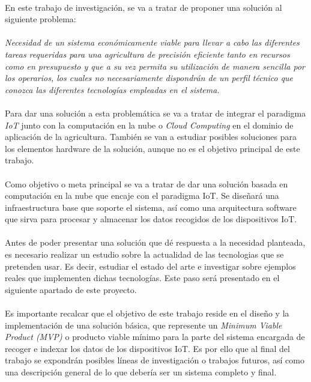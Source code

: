 \documentclass[../../memoria.tex]{subfiles}
\begin{document}
\paragraph{}
En este trabajo de investigación, se va a tratar de proponer una solución al siguiente problema:

\paragraph{}
\textit{
    Necesidad de un sistema económicamente viable para llevar a cabo las diferentes tareas requeridas para una agricultura de precisión eficiente tanto en recursos como en presupuesto y que a su vez permita su utilización de manera sencilla por los operarios, los cuales no necesariamente dispondrán de un perfil técnico que conozca las diferentes tecnologías empleadas en el sistema.
}

\paragraph{}
Para dar una solución a esta problemática se va a tratar de integrar el paradigma \textit{IoT} junto con la computación en la nube o \textit{Cloud Computing} en el dominio de aplicación de la agricultura. También se van a estudiar posibles soluciones para los elementos hardware de la solución, aunque no es el objetivo principal de este trabajo.

\paragraph{}
Como objetivo o meta principal se va a tratar de dar una solución basada en computación en la nube que encaje con el paradigma IoT. Se diseñará una infraestructura base que soporte el sistema, así como una arquitectura software que sirva para procesar y almacenar los datos recogidos de los dispositivos IoT.

\paragraph{}
Antes de poder presentar una solución que dé respuesta a la necesidad planteada, es necesario realizar un estudio sobre la actualidad de las tecnologias que se pretenden usar. Es decir, estudiar el estado del arte e investigar sobre ejemplos reales que implementen dichas tecnologías. Este paso será presentado en el siguiente apartado de este proyecto.

\paragraph{}
Es importante recalcar que el objetivo de este trabajo reside en el diseño y la implementación de una solución básica, que represente un \textit{Minimum Viable Product (MVP)} o producto viable mínimo para la parte del sistema encargada de recoger e indexar los datos de los dispositivos IoT. Es por ello que al final del trabajo se expondrán posibles líneas de investigación o trabajos futuros, así como una descripción general de lo que debería ser un sistema completo y final.
\end{document}
